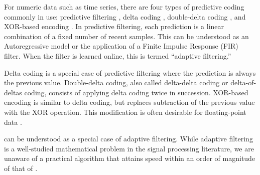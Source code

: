 For numeric data such as time series, there are four types of predictive coding commonly in use: predictive filtering \cite{png}, delta coding \cite{fastpfor, bbp}, double-delta coding \cite{influxDB, gorilla}, and XOR-based encoding \cite{gorilla}. In predictive filtering, each prediction is a linear combination of a fixed number of recent samples. This can be understood as an Autoregressive model or the application of a Finite Impulse Response (FIR) filter. When the filter is learned online, this is termed ``adaptive filtering.''

Delta coding is a special case of predictive filtering where the prediction is always the previous value. Double-delta coding, also called delta-delta coding or delta-of-deltas coding, consists of applying delta coding twice in succession. XOR-based encoding is similar to delta coding, but replaces subtraction of the previous value with the XOR operation. This modification is often desirable for floating-point data \cite{gorilla}.

\fire can be understood as a special case of adaptive filtering. While adaptive filtering is a well-studied mathematical problem in the signal processing literature, we are unaware of a practical algorithm that attains speed within an order of magnitude of that of \fire. %




